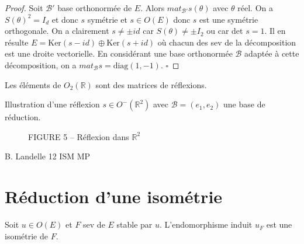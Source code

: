 \begin{proof}

Soit $\mathcal{B}'$ base orthonormée de $E$. Alors $mat_{\mathcal{B}'} s( \theta)$ avec $\theta$ réel. On a $S(\theta)^2 = I_d$ et donc $s$ symétrie et $s \in O(E)$ donc $s$ est une symétrie orthogonale. On a clairement
$s \neq \pm id$ car $S(\theta) \neq \pm I_2$ ou car det $s = 1$. Il en résulte $E = \text{Ker}(s - id) \oplus \text{Ker}(s + id)$
où chacun des sev de la décomposition est une droite vectorielle. En considérant une base
orthonormée $\mathcal{B}$ adaptée à cette décomposition, on a $mat_{\mathcal{B}} s = \text{diag}(1, -1)$.
$\square$

\end{proof}

\begin{remark}

Les éléments de $O_2(\mathbb{R})$ sont des matrices de réflexions.

Illustration d'une réflexion $s \in O^-(\mathbb{R}^2)$ avec
$\mathcal{B} = (e_1, e_2)$ une base de réduction.

\begin{figure}[H]
\centering
{}
\caption{FIGURE 5 – Réflexion dans $\mathbb{R}^2$}
\end{figure}

B. Landelle \hspace{2cm} 12 \hspace{5cm} ISM MP

\end{remark}

\section{Réduction d'une isométrie}

\begin{proposition}
\label{prop:22}

Soit $u \in O(E)$ et $F$ sev de $E$ stable par $u$. L'endomorphisme induit $u_F$ est une isométrie de $F$.

\end{proposition}

